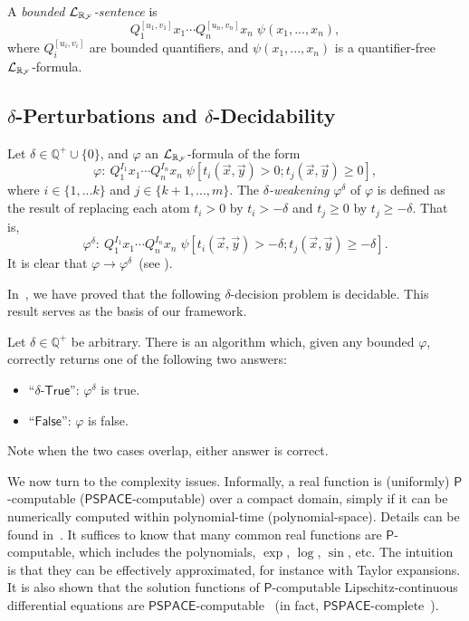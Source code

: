 \documentclass[12pt]{article}
\begin{document}
\begin{definition}
A {\em bounded $\mathcal{L}_{\mathbb{R}_{\mathcal{F}}}$-sentence} is
$$Q_1^{[u_1,v_1]}x_1\cdots Q_n^{[u_n,v_n]}x_n\;\psi(x_1,...,x_n),$$
where $Q_i^{[u_i,v_i]}$ are bounded quantifiers, and $\psi(x_1,...,x_n)$ is a
quantifier-free $\mathcal{L}_{\mathbb{R}_{\mathcal{F}}}$-formula.
\end{definition}


\subsection{$\delta$-Perturbations and $\delta$-Decidability}
\begin{definition}\label{variants}
Let $\delta\in \mathbb{Q}^+\cup\{0\}$, and $\varphi$ an
$\mathcal{L}_{\mathbb{R}_{\mathcal{F}}}$-formula of the form
$$\varphi: \ Q_1^{I_1}x_1\cdots Q_n^{I_n}x_n\;\psi[t_i(\vec x, \vec y)>0;
t_j(\vec x, \vec
y)\geq 0],$$ where $i\in\{1,...k\}$ and $j\in\{k+1,...,m\}$. The {\em
$\delta$-weakening} $\varphi^{\delta}$ of $\varphi$ is
defined as the result of replacing each atom $t_i > 0$ by $t_i >
-\delta$ and $t_j \geq 0$ by $t_j \geq -\delta$. That is,
$$\varphi^{\delta}:\ Q_1^{I_1}x_1\cdots Q_n^{I_n}x_n\;\psi[t_i(\vec x, \vec
y)>-\delta; t_j(\vec x,
\vec y)\geq -\delta].$$
It is clear that $\varphi\rightarrow\varphi^{\delta}$~(see \cite{DBLP:conf/lics/GaoAC12}).
\end{definition}
In~\cite{DBLP:conf/lics/GaoAC12,DBLP:conf/cade/GaoAC12}, we have proved that the following $\delta$-decision problem is decidable. This result serves as the basis of our framework.
\begin{theorem}\label{delta-decide} Let $\delta\in\mathbb{Q}^+$ be
arbitrary. There is an algorithm which, given any bounded $\varphi$,
correctly returns one of the following two answers:
\begin{itemize}
\item ``$\delta$-$\mathsf{True}$'': $\varphi^{\delta}$ is true.
\item ``$\mathsf{False}$'': $\varphi$ is false.
\end{itemize}
Note when the two cases overlap, either answer is correct.
\end{theorem}
We now turn to the complexity issues. Informally, a real function is (uniformly) $\mathsf{P}$-computable ($\mathsf{PSPACE}$-computable) over a compact domain, simply if it can be numerically computed within polynomial-time (polynomial-space). Details can be found in~\cite{kobook,DBLP:conf/lics/GaoAC12}. It suffices to know that many common real functions are $\mathsf{P}$-computable, which includes the polynomials, $\exp$, $\log$, $\sin$, etc. The intuition is that they can be effectively approximated, for instance with Taylor expansions. It is also shown that the solution functions of $\mathsf{P}$-computable Lipschitz-continuous differential equations are $\mathsf{PSPACE}$-computable~\cite{kobook} (in fact, $\mathsf{PSPACE}$-complete~\cite{Kawamura09}).
\end{document}
